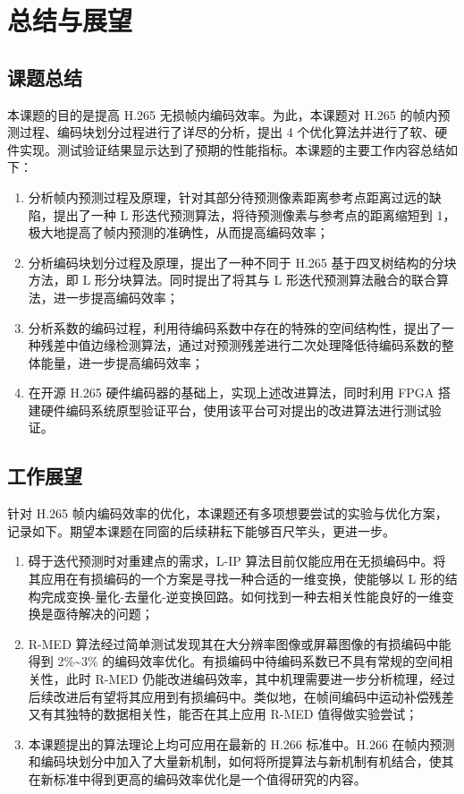 \chapter{总结与展望}
\label{cha:c5}

\section{课题总结}
本课题的目的是提高 H.265 无损帧内编码效率。为此，本课题对 H.265 的帧内预测过程、编码块划分过程进行了详尽的分析，提出 4 个优化算法并进行了软、硬件实现。测试验证结果显示达到了预期的性能指标。本课题的主要工作内容总结如下：
\begin{enumerate}
    \item 分析帧内预测过程及原理，针对其部分待预测像素距离参考点距离过远的缺陷，提出了一种 L 形迭代预测算法，将待预测像素与参考点的距离缩短到 1，极大地提高了帧内预测的准确性，从而提高编码效率；
    \item 分析编码块划分过程及原理，提出了一种不同于 H.265 基于四叉树结构的分块方法，即 L 形分块算法。同时提出了将其与 L 形迭代预测算法融合的联合算法，进一步提高编码效率；
    \item 分析系数的编码过程，利用待编码系数中存在的特殊的空间结构性，提出了一种残差中值边缘检测算法，通过对预测残差进行二次处理降低待编码系数的整体能量，进一步提高编码效率；
    \item 在开源 H.265 硬件编码器的基础上，实现上述改进算法，同时利用 FPGA 搭建硬件编码系统原型验证平台，使用该平台可对提出的改进算法进行测试验证。
\end{enumerate}

\section{工作展望}
针对 H.265 帧内编码效率的优化，本课题还有多项想要尝试的实验与优化方案，记录如下。期望本课题在同窗的后续耕耘下能够百尺竿头，更进一步。
\begin{enumerate}
    \item 碍于迭代预测时对重建点的需求，L-IP 算法目前仅能应用在无损编码中。将其应用在有损编码的一个方案是寻找一种合适的一维变换，使能够以 L 形的结构完成变换-量化-去量化-逆变换回路。如何找到一种去相关性能良好的一维变换是亟待解决的问题；
    \item R-MED 算法经过简单测试发现其在大分辨率图像或屏幕图像的有损编码中能得到 2\%\textasciitilde 3\% 的编码效率优化。有损编码中待编码系数已不具有常规的空间相关性，此时 R-MED 仍能改进编码效率，其中机理需要进一步分析梳理，经过后续改进后有望将其应用到有损编码中。类似地，在帧间编码中运动补偿残差又有其独特的数据相关性，能否在其上应用 R-MED 值得做实验尝试；
    \item 本课题提出的算法理论上均可应用在最新的 H.266 标准中。H.266 在帧内预测和编码块划分中加入了大量新机制，如何将所提算法与新机制有机结合，使其在新标准中得到更高的编码效率优化是一个值得研究的内容。
\end{enumerate}